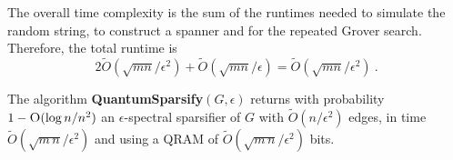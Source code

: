The overall time complexity is the sum of the runtimes needed to simulate the random string, to construct a spanner and for the repeated Grover search. Therefore, the total runtime is
$$2 \tilde{O}(\sqrt{mn}/\epsilon^2) + \tilde{O}(\sqrt{mn}/\epsilon) = \tilde{O}(\sqrt{mn}/\epsilon^2) \ . $$


\begin{theorem} \label{th:qu-spectral-sparsification}
The algorithm \textbf{QuantumSparsify}$(G,\epsilon)$ returns with probability $1-\textsc{O}(\log n/n^2)$ an $\epsilon$-spectral sparsifier of $G$ with $\tilde{O}(n/\epsilon^2)$ edges, in time $\tilde{O}(\sqrt{m\,n}/\epsilon^2)$ and using a QRAM of $\tilde{O}(\sqrt{m\,n}/\epsilon^2)$ bits.
\end{theorem}

